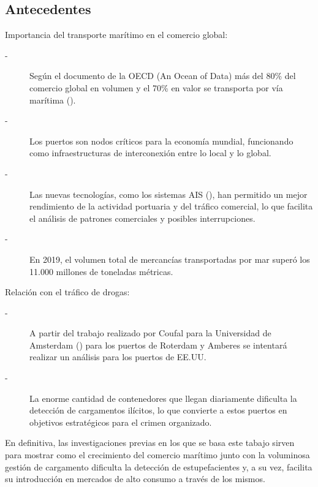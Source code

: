 \documentclass[12pt]{article}
\begin{document}
	\subsection{\label{antecedentes}Antecedentes}
	Importancia del transporte marítimo en el comercio global:
	\begin{description}
		\item[-] Según el documento de la OECD (An Ocean of Data) más del 80\% del comercio global en volumen y el 70\% en valor se transporta por vía marítima (\cite{pilgrim2024ocean}).
		\item[-] Los puertos son nodos críticos para la economía mundial, funcionando como infraestructuras de interconexión entre lo local y lo global.
		\item[-] Las nuevas tecnologías, como los sistemas AIS (\cite{nauticaprofesional2025ais}), han permitido un mejor rendimiento de la actividad portuaria y del tráfico comercial, lo que facilita el análisis de patrones comerciales y posibles interrupciones.
		\item[-] En 2019, el volumen total de mercancías transportadas por mar superó los 11.000 millones de toneladas métricas. \cite{cidob2025maritime}
	\end{description}
	
	Relación con el tráfico de drogas:
	\begin{description}
		\item[-] A partir del trabajo realizado por Coufal para la Universidad de Amsterdam (\cite{coufal2023cities}) para los puertos de Roterdam y Amberes se intentará realizar un análisis para los puertos de EE.UU.
		\item[-] La enorme cantidad de contenedores que llegan diariamente dificulta la detección de cargamentos ilícitos, lo que convierte a estos puertos en objetivos estratégicos para el crimen organizado.
	\end{description}

	En definitiva, las investigaciones previas en los que se basa este tabajo sirven para mostrar como el crecimiento del comercio marítimo junto con la voluminosa gestión de cargamento dificulta la detección de estupefacientes y, a su vez, facilita su introducción en mercados de alto consumo a través de los mismos.
	
\end{document}
